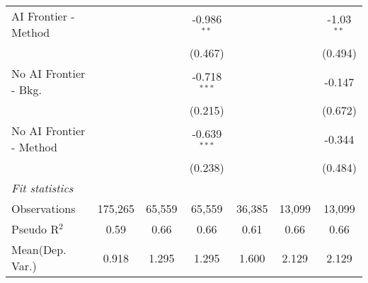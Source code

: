 \begin{tabular}{lcccccc}
   AI Frontier - Method    &                &              & -0.986$^{**}$  &               &               & -1.03$^{**}$\\   
                           &                &              & (0.467)        &               &               & (0.494)\\   
   No AI Frontier - Bkg.   &                &              & -0.718$^{***}$ &               &               & -0.147\\   
                           &                &              & (0.215)        &               &               & (0.672)\\   
   No AI Frontier - Method &                &              & -0.639$^{***}$ &               &               & -0.344\\   
                           &                &              & (0.238)        &               &               & (0.484)\\   
   \midrule
   \emph{Fit statistics}\\
   Observations            & 175,265        & 65,559       & 65,559         & 36,385        & 13,099        & 13,099\\  
   Pseudo R$^2$            & 0.59           & 0.66         & 0.66           & 0.61          & 0.66          & 0.66\\  
Mean(Dep. Var.) & 0.918 & 1.295 & 1.295 & 1.600 & 2.129 & 2.129 \\
   

\end{tabular}
